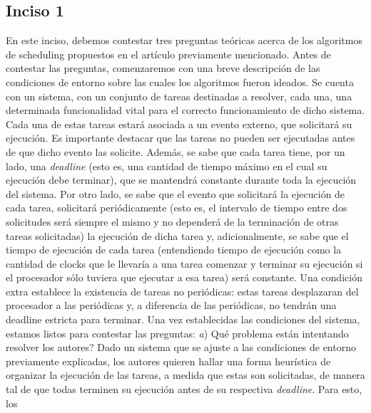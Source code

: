 \subsection*{Inciso 1}
En este inciso, debemos contestar tres preguntas te\'oricas acerca de los algoritmos de scheduling propuestos en el art\'iculo previamente mencionado. Antes de 
contestar las preguntas, comenzaremos con una breve descripci\'on de las condiciones de entorno sobre las cuales los algoritmos fueron ideados.
\newline
\newline
Se cuenta con un sistema, con un conjunto de tareas destinadas a resolver, cada una, una determinada funcionalidad vital para el correcto funcionamiento
de dicho sistema. Cada una de estas tareas estar\'a asociada a un evento externo, que solicitar\'a su ejecuci\'on. Es importante destacar que las tareas no
pueden ser ejecutadas antes de que dicho evento las solicite. Adem\'as, se sabe que cada tarea tiene, por un lado, una \textit{deadline} (esto es, una cantidad
de tiempo m\'aximo en el cual su ejecuci\'on debe terminar), que se mantendr\'a constante durante toda la ejecuci\'on del sistema. Por otro lado, se sabe
que el evento que solicitar\'a la ejecuci\'on de cada tarea, solicitar\'a peri\'odicamente (esto es, el intervalo de tiempo entre dos solicitudes ser\'a
siempre el mismo y no depender\'a de la terminaci\'on de otras tareas solicitadas) la ejecuci\'on de dicha tarea y, adicionalmente, se sabe que el tiempo de 
ejecuci\'on de cada tarea (entendiendo tiempo de ejecuci\'on como la cantidad de clocks que le llevar\'ia a una tarea comenzar y terminar su ejecuci\'on si el 
procesador s\'olo tuviera que ejecutar a esa tarea) ser\'a constante. Una condici\'on extra establece la existencia de tareas no peri\'odicas: estas tareas
desplazaran del procesador a las peri\'odicas y, a diferencia de las peri\'odicas, no tendr\'an una deadline estricta para terminar. Una vez establecidas
las condiciones del sistema, estamos listos para contestar las preguntas:
\newline
\newline
\textit{a}) \textquestiondown Qu\'e problema est\'an intentando resolver los autores?
\newline
\newline
Dado un sistema que se ajuste a las condiciones de entorno previamente explicadas, los autores quieren hallar una forma heur\'istica de organizar la ejecuci\'on de las
tareas, a medida que estas son solicitadas, de manera tal de que todas terminen su ejecuci\'on antes de su respectiva \textit{deadline}. Para esto, los 
